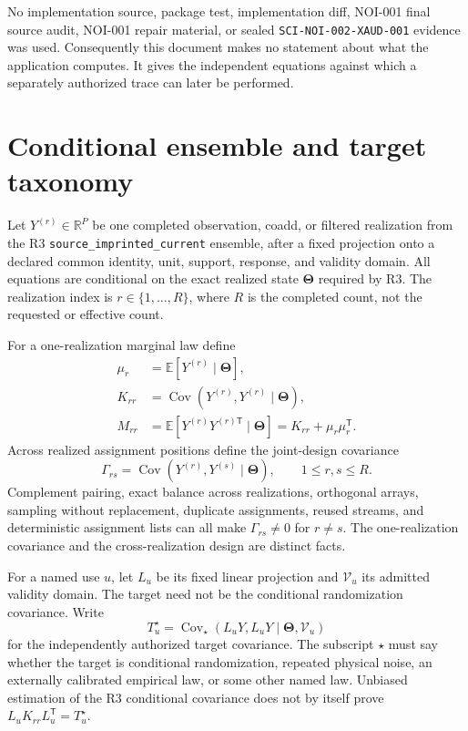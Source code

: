 \documentclass[11pt]{article}
\newcommand{\E}{\mathbb{E}}
\newcommand{\Cov}{\operatorname{Cov}}
\newcommand{\ThetaV}{\boldsymbol{\Theta}}
\begin{document}
No implementation source, package test, implementation diff, NOI-001 final
source audit, NOI-001 repair material, or sealed
\texttt{SCI-NOI-002-XAUD-001} evidence was used.  Consequently this document
makes no statement about what the application computes.  It gives the
independent equations against which a separately authorized trace can later
be performed.

\section{Conditional ensemble and target taxonomy}

Let $Y^{(r)}\in\mathbb R^P$ be one completed observation, coadd, or filtered
realization from the R3 \texttt{source\_imprinted\_current} ensemble, after a
fixed projection onto a declared common identity, unit, support, response, and
validity domain.  All equations are conditional on the exact realized state
$\ThetaV$ required by R3.  The realization index is $r\in\{1,\ldots,R\}$,
where $R$ is the completed count, not the requested or effective count.

For a one-realization marginal law define
\begin{align}
  \mu_r &= \E[Y^{(r)}\mid\ThetaV],
  \label{eq:marginal-mean}\\
  K_{rr} &= \Cov(Y^{(r)},Y^{(r)}\mid\ThetaV),
  \label{eq:marginal-covariance}\\
  M_{rr} &= \E[Y^{(r)}Y^{(r)\mathsf T}\mid\ThetaV]
          =K_{rr}+\mu_r\mu_r^{\mathsf T}.
  \label{eq:marginal-second-moment}
\end{align}
Across realized assignment positions define the joint-design covariance
\begin{equation}
  \Gamma_{rs}
  =\Cov(Y^{(r)},Y^{(s)}\mid\ThetaV),
  \qquad 1\le r,s\le R.
  \label{eq:cross-realization-covariance}
\end{equation}
Complement pairing, exact balance across realizations, orthogonal arrays,
sampling without replacement, duplicate assignments, reused streams, and
deterministic assignment lists can all make $\Gamma_{rs}\ne0$ for $r\ne s$.
The one-realization covariance and the cross-realization design are distinct
facts.

For a named use $u$, let $L_u$ be its fixed linear projection and
$\mathcal V_u$ its admitted validity domain.  The target need not be the
conditional randomization covariance.  Write
\begin{equation}
  T_u^\star
  =\Cov_{\star}(L_uY,L_uY\mid\ThetaV,\mathcal V_u)
  \label{eq:consumer-target}
\end{equation}
for the independently authorized target covariance.  The subscript $\star$
must say whether the target is conditional randomization, repeated physical
noise, an externally calibrated empirical law, or some other named law.
Unbiased estimation of the R3 conditional covariance does not by itself prove
$L_uK_{rr}L_u^{\mathsf T}=T_u^\star$.
\end{document}
